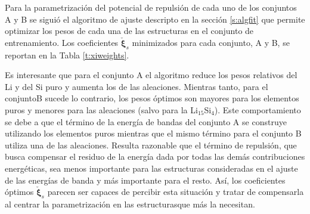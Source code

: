 Para la parametrización del potencial de repulsión de cada uno de los conjuntos 
A y B se siguió el algoritmo de ajuste descripto en la sección \ref{s:algfit}
que permite optimizar los pesos de cada una de las estructuras en el conjunto de 
entrenamiento. Los coeficientes $\check{\boldsymbol{\xi}}_s$ minimizados para cada
conjunto, A y B, se reportan en la Tabla \ref{t:xiweights}.
\begin{table}[h!]
    \centering
    \caption{Pesos óptimos, $\check{\boldsymbol{xi}}_s$, de cada conjunto.}
    \setlength\extrarowheight{2pt}
    \label{t:xiweights}
\end{table}
Es interesante que para el conjunto A el algoritmo reduce los pesos relativos del 
Li y del Si puro y aumenta los de las aleaciones. Mientras tanto, para el conjuntoB sucede lo contrario, los pesos óptimos son mayores para los elementos puros y
menores para las aleaciones (salvo para la Li$_{15}$Si$_4$). Este comportamiento 
se debe a que el término de la energía de bandas del conjunto A se construye 
utilizando los elementos puros mientras que el mismo término para el conjunto B
utiliza una de las aleaciones. Resulta razonable que el término de repulsión, que
busca compensar el residuo de la energía dada por todas las demás contribuciones 
energéticas, sea menos importante para las estructuras consideradas en el ajuste
de las energías de banda y más importante para el resto. Así, los coeficientes
óptimos $\check{\boldsymbol{\xi}}_s$ parecen ser capaces de percibir esta 
situación y tratar de compensarla al centrar la parametrización en las estructurasque más la necesitan.


